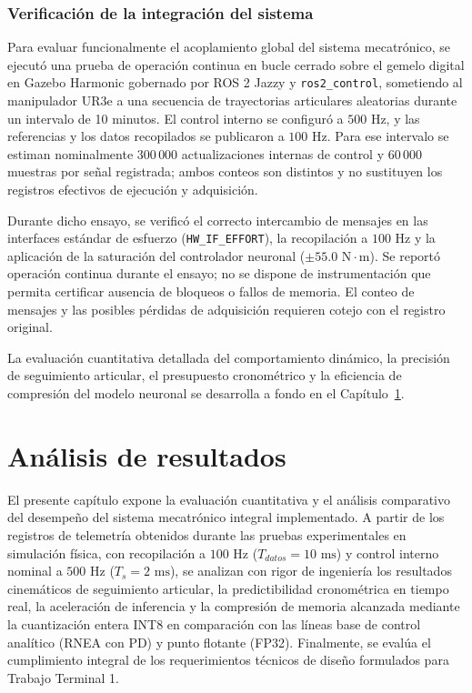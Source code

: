 \documentclass[12pt]{article}
\begin{document}
\subsubsection{Verificación de la integración del sistema}
\label{sec:ver_sistema_mecatronico}

Para evaluar funcionalmente el acoplamiento global del sistema mecatrónico, se ejecutó una prueba de operación continua en bucle cerrado sobre el gemelo digital en Gazebo Harmonic gobernado por ROS 2 Jazzy y \texttt{ros2\_control}, sometiendo al manipulador UR3e a una secuencia de trayectorias articulares aleatorias durante un intervalo de 10 minutos. El control interno se configuró a $500\text{ Hz}$, y las referencias y los datos recopilados se publicaron a $100\text{ Hz}$. Para ese intervalo se estiman nominalmente $300\,000$ actualizaciones internas de control y $60\,000$ muestras por señal registrada; ambos conteos son distintos y no sustituyen los registros efectivos de ejecución y adquisición.

Durante dicho ensayo, se verificó el correcto intercambio de mensajes en las interfaces estándar de esfuerzo (\texttt{HW\_IF\_EFFORT}), la recopilación a $100\text{ Hz}$ y la aplicación de la saturación del controlador neuronal ($\pm 55.0\text{ N}\cdot\text{m}$). Se reportó operación continua durante el ensayo; no se dispone de instrumentación que permita certificar ausencia de bloqueos o fallos de memoria. El conteo de mensajes y las posibles pérdidas de adquisición requieren cotejo con el registro original.

La evaluación cuantitativa detallada del comportamiento dinámico, la precisión de seguimiento articular, el presupuesto cronométrico y la eficiencia de compresión del modelo neuronal se desarrolla a fondo en el Capítulo~\ref{sec:analisis_resultados}.


\newpage
\section{Análisis de resultados}
\label{sec:analisis_resultados}

El presente capítulo expone la evaluación cuantitativa y el análisis comparativo del desempeño del sistema mecatrónico integral implementado. A partir de los registros de telemetría obtenidos durante las pruebas experimentales en simulación física, con recopilación a $100\text{ Hz}$ ($T_{datos}=10\text{ ms}$) y control interno nominal a $500\text{ Hz}$ ($T_s=2\text{ ms}$), se analizan con rigor de ingeniería los resultados cinemáticos de seguimiento articular, la predictibilidad cronométrica en tiempo real, la aceleración de inferencia y la compresión de memoria alcanzada mediante la cuantización entera INT8 en comparación con las líneas base de control analítico (RNEA con PD) y punto flotante (FP32). Finalmente, se evalúa el cumplimiento integral de los requerimientos técnicos de diseño formulados para Trabajo Terminal 1.
\end{document}
